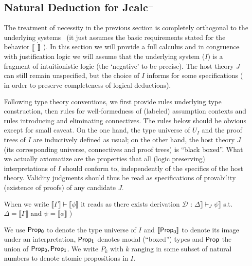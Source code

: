 	\subsection{Natural Deduction for Jcalc$^{-}$}
	The treatment of necessity in the previous section is completely orthogonal to the underlying systems \
	(it just assumes the basic requirements stated for the behavior $\llbracket\dot\rrbracket$). 
	In this section we will provide a full calculus and in congruence with justification logic we will
	assume that the underlying system ($I$) is a fragment of intuitionistic logic (the `negative' to be precise).
	The host theory $J$ can still remain unspecified, but the choice of $I$ informs for some specifications ( in order to preserve
	completeness of logical deductions).   

	Following type theory conventions,  we first provide rules underlying type construction, then  rules for  well-formedness of (labeled) assumption contexts and rules  introducing and eliminating connectives. 
	The rules below should be obvious except for small caveat.
	 On the one hand, the type universe of $U_I$ and the proof trees of $I$ are 
	inductively defined as usual; on the other 
	hand, the host theory $J$ (its corresponding universe, connectives and  proof trees) is  ``black boxed''. What we actually axiomatize are the properties that all
	(logic preserving) interpretations of $I$ should conform to, independently of the specifics of the host theory. 
	Validity judgments should thus be read  as specifications
	of provability (existence of proofs) of any candidate $J$. 
	
	When we write $\llbracket \Gamma\rrbracket\vdash\llbracket\phi\rrbracket$ it reads as there exists derivation
	$\mathcal{D}$ : $\Delta\rrbracket\vdash_{J}\psi\rrbracket$ s.t. $\Delta=\llbracket\Gamma\rrbracket$ and $\psi = \llbracket \phi\rrbracket$ )
	
	We use ${\sf Prop_0}$  to denote  the type universe of $I$ and $\llbracket \sf Prop_0\rrbracket $ to denote its image under an interpretation, ${\sf Prop_1}$ denotes   modal (``boxed'') types
	and ${\sf Prop}$  the union of ${\sf Prop_0, Prop_1}$. We write $P_k$ with $k$ ranging in some subset of natural numbers to denote atomic propositions in $I$. 
	
	
	
